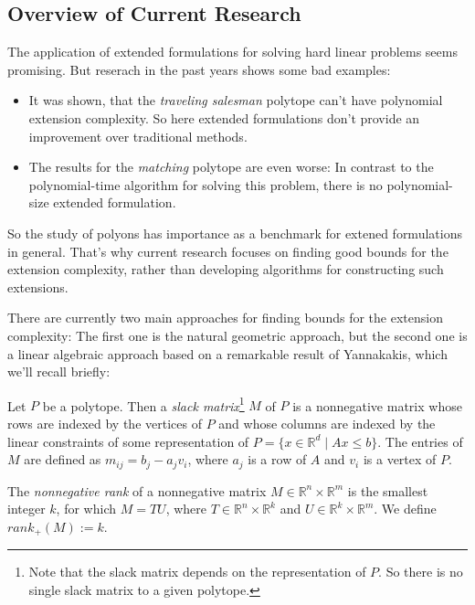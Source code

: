\subsection{Overview of Current Research}
The application of extended formulations for solving hard linear problems seems promising. But reserach in the past years shows some bad examples:
\begin{itemize}
  \item It was shown, that the \textit{traveling salesman} polytope can't have polynomial extension complexity. So here extended formulations don't provide an improvement over traditional methods.
  \item The results for the \textit{matching} polytope are even worse: In contrast to the polynomial-time algorithm for solving this problem, there is no polynomial-size extended formulation.
\end{itemize}
So the study of polyons has importance as a benchmark for extened formulations in general.
That's why current research focuses on finding good bounds for the extension complexity, rather than developing algorithms for constructing such extensions.

There are currently two main approaches for finding bounds for the extension complexity: The first one is the natural geometric approach, but the second one is a linear algebraic approach based on a remarkable result of Yannakakis, which we'll recall briefly:

\begin{definition}
  Let $P$ be a polytope.
  Then a \textit{slack matrix}\footnote{Note that the slack matrix depends on the representation of $P$. So there is no single slack matrix to a given polytope.} $M$ of $P$ is a nonnegative matrix whose rows are indexed by the vertices of $P$ and whose columns are indexed by the linear constraints of some representation of $P=\{x \in \mathbb{R}^d \mid Ax \leq b\}$. 
  The entries of $M$ are defined as $m_{ij} = b_j - a_j v_i$, where $a_j$ is a row of $A$ and $v_i$ is a vertex of $P$.
\end{definition}

\begin{definition}
  The \textit{nonnegative rank} of a nonnegative matrix $M \in \mathbb{R}^n \times \mathbb{R}^m$ is the smallest integer $k$, for which $M = TU$, where $T \in \mathbb{R}^n \times \mathbb{R}^k$ and $U \in \mathbb{R}^k \times \mathbb{R}^m$.
  We define $rank_+(M) := k$.
\end{definition}

